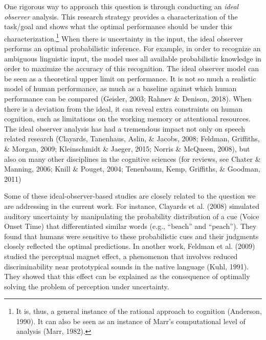 \documentclass[english,floatsintext,man]{apa6}
\theoremstyle{definition}
\theoremstyle{definition}
\theoremstyle{definition}
\theoremstyle{remark}
\begin{document}
One rigorous way to approach this question is through conducting an
\emph{ideal observer} analysis. This research strategy provides a
characterization of the task/goal and shows what the optimal performance
should be under this characterization.\footnote{It is, thus, a general
  instance of the rational approach to cognition (Anderson, 1990). It
  can also be seen as an instance of Marr's computational level of
  analysis (Marr, 1982).} When there is uncertainty in the input, the
ideal observer performs an optimal probabilistic inference. For example,
in order to recognize an ambiguous linguistic input, the model uses all
available probabilistic knowledge in order to maximize the accuracy of
this recognition. The ideal observer model can be seen as a theoretical
upper limit on performance. It is not so much a realistic model of human
performance, as much as a baseline against which human performance can
be compared (Geisler, 2003; Rahnev \& Denison, 2018). When there is a
deviation from the ideal, it can reveal extra constraints on human
cognition, such as limitations on the working memory or attentional
resources. The ideal observer analysis has had a tremendous impact not
only on speech related research (Clayards, Tanenhaus, Aslin, \& Jacobs,
2008; Feldman, Griffiths, \& Morgan, 2009; Kleinschmidt \& Jaeger, 2015;
Norris \& McQueen, 2008), but also on many other disciplines in the
cognitive sciences (for reviews, see Chater \& Manning, 2006; Knill \&
Pouget, 2004; Tenenbaum, Kemp, Griffiths, \& Goodman, 2011)

Some of these ideal-observer-based studies are closely related to the
question we are addressing in the current work. For instance, Clayards
et al. (2008) simulated auditory uncertainty by manipulating the
probability distribution of a cue (Voice Onset Time) that differentiated
similar words (e.g., \enquote{beach} and \enquote{peach}). They found
that humans were sensitive to these probabilistic cues and their
judgments closely reflected the optimal predictions. In another work,
Feldman et al. (2009) studied the perceptual magnet effect, a phenomenon
that involves reduced discriminability near prototypical sounds in the
native language (Kuhl, 1991). They showed that this effect can be
explained as the consequence of optimally solving the problem of
perception under uncertainty.
\end{document}
